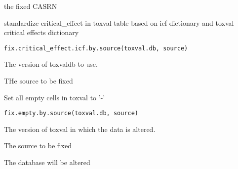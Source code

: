\documentclass[letterpaper]{book}
\begin{document}
%
\begin{Value}
the fixed CASRN
\end{Value}
%
\begin{Description}\relax
standardize critical\_effect in toxval table based on icf dictionary and toxval critical effects dictionary
\end{Description}
%
\begin{Usage}
\begin{verbatim}
fix.critical_effect.icf.by.source(toxval.db, source)
\end{verbatim}
\end{Usage}
%
\begin{Arguments}
\begin{ldescription}
\item[\code{toxval.db}] The version of toxvaldb to use.

\item[\code{source}] THe source to be fixed
\end{ldescription}
\end{Arguments}
%
\begin{Description}\relax
Set all empty cells in toxval to '-'
\end{Description}
%
\begin{Usage}
\begin{verbatim}
fix.empty.by.source(toxval.db, source)
\end{verbatim}
\end{Usage}
%
\begin{Arguments}
\begin{ldescription}
\item[\code{toxval.db}] The version of toxval in which the data is altered.

\item[\code{source}] The source to be fixed
\end{ldescription}
\end{Arguments}
%
\begin{Value}
The database will be altered
\end{Value}
%
\end{document}
